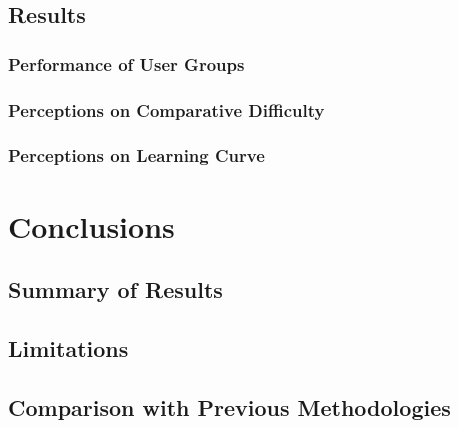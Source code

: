 \subsection{Results}

\subsubsection{Performance of User Groups}

\subsubsection{Perceptions on Comparative Difficulty}

\subsubsection{Perceptions on Learning Curve}


\section{Conclusions}

\subsection{Summary of Results}

\subsection{Limitations}

\subsection{Comparison with Previous Methodologies}

